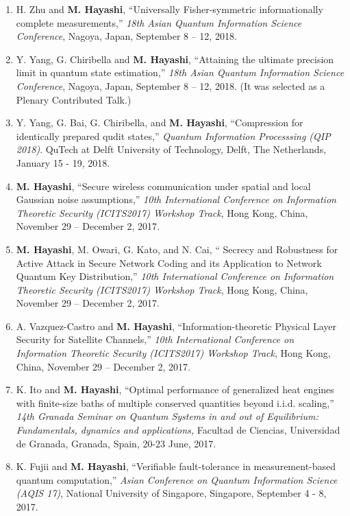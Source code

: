 \documentclass[a4paper,12pt,oneside]{article}
\begin{document}
\begin{enumerate}
\item 
H. Zhu and \textbf{M. Hayashi},
``Universally Fisher-symmetric informationally complete measurements,''
{\em 18th Asian Quantum Information Science Conference},
Nagoya, Japan, September 8 -- 12, 2018.

\item 
Y. Yang, G. Chiribella and \textbf{M. Hayashi},
``Attaining the ultimate precision limit in quantum state estimation,''
{\em 18th Asian Quantum Information Science Conference},
Nagoya, Japan, September 8 -- 12, 2018.
(It was selected as a Plenary Contributed Talk.)

\item 
Y. Yang, G. Bai, G. Chiribella, and \textbf{M. Hayashi}, 
``Compression for identically prepared qudit states,'' 
{\em Quantum Information Processsing (QIP 2018)}.
QuTech at Delft University of Technology, Delft, The Netherlands,
January 15 - 19, 2018.

\item 
\textbf{M. Hayashi},
``Secure wireless communication under spatial and local Gaussian noise assumptions,''
{\em 10th International Conference on Information Theoretic Security (ICITS2017) Workshop Track}, 
Hong Kong, China, November 29  -- December 2, 2017.


\item 
\textbf{M. Hayashi}, M. Owari, G. Kato, and N. Cai,
`` Secrecy and Robustness for Active Attack in Secure Network Coding and its Application to  Network Quantum Key Distribution,''
{\em 10th International Conference on Information Theoretic Security (ICITS2017) Workshop Track}, 
Hong Kong, China, November 29  -- December 2, 2017.


\item 
A. Vazquez-Castro and \textbf{M. Hayashi},
``Information-theoretic Physical Layer Security for Satellite Channels,''
{\em 10th International Conference on Information Theoretic Security (ICITS2017) Workshop Track}, 
Hong Kong, China, November 29  -- December 2, 2017.

\item 
K. Ito and \textbf{M. Hayashi}, 
``Optimal performance of generalized heat engines with finite-size baths of multiple conserved quantities beyond i.i.d. scaling,'' 
{\em 14th Granada Seminar on Quantum Systems
in and out of Equilibrium: Fundamentals, dynamics and applications,} 
Facultad de Ciencias, Universidad de Granada, Granada, Spain, 20-23 June, 2017.

\item 
K. Fujii and \textbf{M. Hayashi}, ``Verifiable fault-tolerance in measurement-based quantum computation,'' 
{\em Asian Conference on Quantum Information Science (AQIS 17)}, 
National University of Singapore, Singapore, September 4 - 8, 2017.


\end{enumerate}
\end{document}
